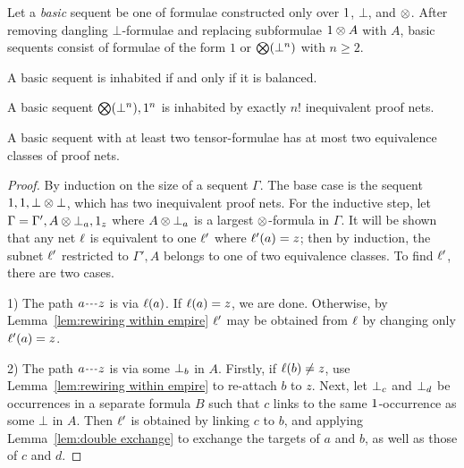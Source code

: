 \documentclass{sigplanconf}
\begin{document}
Let a \emph{basic} sequent be one of formulae constructed only over $1$, $\bot$, and $\otimes$.
%
After removing \color{red}dangling \color{black} $\bot$-formulae and replacing subformulae $1\otimes A$ with $A$, basic sequents consist of formulae of the form $1$ or $\bigotimes(\bot^n)$ with $n\geq2$.


\begin{proposition}
A basic sequent is inhabited if and only if it is balanced.
\end{proposition}

\begin{proposition}
A basic sequent $\bigotimes(\bot^n),1^n$ is inhabited by exactly $n!$ inequivalent proof nets.
\end{proposition}

\begin{proposition}
\label{prop:level0 max binary}
%
A basic sequent with at least two tensor-formulae has at most two equivalence classes of proof nets.
%
\end{proposition}


\begin{proof}
By induction on the size of a sequent $\Gamma$.
%
The base case is the sequent $1,1,\bot\otimes\bot$, which has two inequivalent proof nets.
%
For the inductive step,
%
\color{red}
let $\Gamma=\Gamma',A\otimes\bot_{a},1_{z}$ where $A\otimes\bot_{a}$ is a largest $\otimes$-formula in $\Gamma$.
%
It will be shown that any net $\ell$ is equivalent to one $\ell'$ where $\ell'(a)=z$; then by induction, the subnet $\ell'$ restricted to $\Gamma',A$ belongs to one of two equivalence classes.
%
To find $\ell'$, there are two cases.

1) The path $\path az$ is via $\ell(a)$.
%
If $\ell(a)=z$, we are done. Otherwise, by Lemma~\ref{lem:rewiring within empire} $\ell'$ may be obtained from $\ell$ by changing only $\ell'(a)=z$.


2) The path $\path az$ is via some $\bot_{b}$ in $A$.
%
Firstly, if $\ell(b)\neq z$, use Lemma~\ref{lem:rewiring within empire} to re-attach $b$ to $z$.
%
Next, let $\bot_{c}$ and $\bot_{d}$ be occurrences in a separate formula $B$ such that $c$ links to the same $1$-occurrence as some $\bot$ in $A$.
%
Then $\ell'$ is obtained by linking $c$ to $b$, and applying Lemma~\ref{lem:double exchange} to exchange the targets of $a$ and $b$, as well as those of $c$ and $d$.
%
\end{proof}
\color{black}
\end{document}
